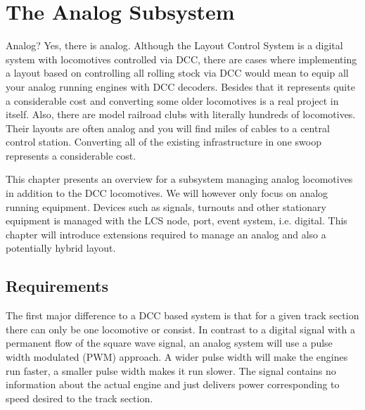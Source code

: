 \chapter{The Analog Subsystem}

Analog? Yes, there is analog. Although the Layout Control System is a digital system with locomotives controlled via DCC, there are cases where implementing a layout based on controlling all rolling stock via DCC would mean to equip all your analog running engines with DCC decoders. Besides that it represents quite a considerable cost and converting some older locomotives is a real project in itself. Also, there are model railroad clubs with literally hundreds of locomotives. Their layouts are often analog and you will find miles of cables to a central control station. Converting all of the existing infrastructure in one swoop represents a considerable cost.

This chapter presents an overview for a subsystem managing analog locomotives in addition to the DCC locomotives. We will however only focus on analog running equipment. Devices such as signals, turnouts and other stationary equipment is managed with the LCS node, port, event system, i.e. digital. This chapter will introduce extensions required to manage an analog and also a potentially hybrid layout.

\section{Requirements}

The first major difference to a DCC based system is that for a given track section there can only be one locomotive or consist. In contrast to a digital signal with a permanent flow of the square wave signal, an analog system will use a pulse width modulated (PWM) approach. A wider pulse width will make the engines run faster, a smaller pulse width makes it run slower. The signal contains no information about the actual engine and just delivers power corresponding to speed desired to the track section.

\begin{center}
\end{center}

